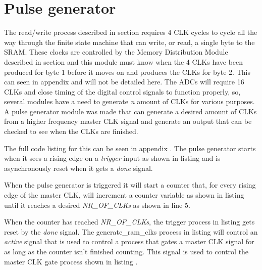 \section{Pulse generator} \label{subsec:Pulse_Generator} 
The read/write process described in section  requires 4 CLK cycles to cycle all the way through the finite state machine that can write, or read, a single byte to the SRAM. These clocks are controlled by the Memory Distribution Module described in section  and this module must know when the 4 CLKs have been produced for byte 1 before it moves on and produces the CLKs for byte 2. This can seen in appendix  and will not be detailed here. The ADCs will require 16 CLKs and close timing of the digital control signals to function properly, so, several modules have a need to generate \textit{n} amount of CLKs for various purposes. A pulse generator module was made that can generate a desired amount of CLKs from a higher frequency master CLK signal and generate an output that can be checked to see when the CLKs are finished.

The full code listing for this can be seen in appendix . The pulse generator starts when it sees a rising edge on a \textit{trigger} input as shown in listing  and is asynchronously reset when it gets a \textit{done} signal.



When the pulse generator is triggered it will start a counter that, for every rising edge of the master CLK, will increment a counter variable as shown in listing  until it reaches a desired \textit{NR\_OF\_CLKs} as shown in line 5.



When the counter has reached \textit{NR\_OF\_CLKs}, the trigger process in listing  gets reset by the \textit{done} signal. The generate\_ram\_clks process in listing  will control an \textit{active} signal that is used to control a process that gates a master CLK signal for as long as the counter isn't finished counting. This signal is used to control the master CLK gate process shown in listing .

